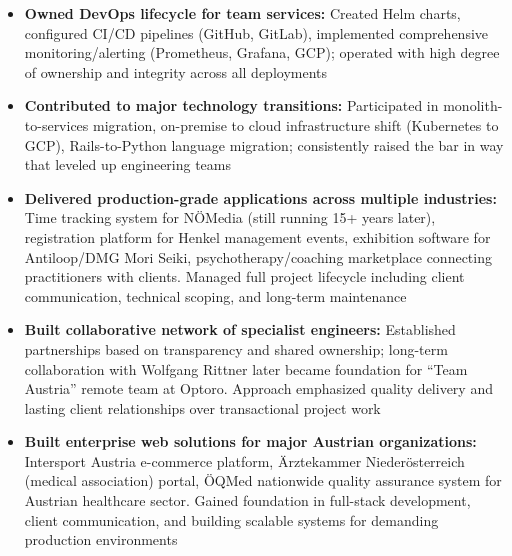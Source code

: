 \documentclass[11pt,a4paper,roman]{moderncv}
\begin{document}
\begin{itemize}[leftmargin=\dimexpr\hintscolumnwidth+\separatorcolumnwidth\relax,itemsep=0pt,topsep=0.35em]
\item \textbf{Owned DevOps lifecycle for team services:} Created Helm charts, configured CI/CD pipelines (GitHub, GitLab), implemented comprehensive monitoring/alerting (Prometheus, Grafana, GCP); operated with high degree of ownership and integrity across all deployments

\item \textbf{Contributed to major technology transitions:} Participated in monolith-to-services migration, on-premise to cloud infrastructure shift (Kubernetes to GCP), Rails-to-Python language migration; consistently raised the bar in way that leveled up engineering teams
\end{itemize}


\begin{itemize}[leftmargin=\dimexpr\hintscolumnwidth+\separatorcolumnwidth\relax,itemsep=0pt,topsep=.35em]
\item \textbf{Delivered production-grade applications across multiple industries:} Time tracking system for NÖMedia (still running 15+ years later), registration platform for Henkel management events, exhibition software for Antiloop/DMG Mori Seiki, psychotherapy/coaching marketplace connecting practitioners with clients. Managed full project lifecycle including client communication, technical scoping, and long-term maintenance

\item \textbf{Built collaborative network of specialist engineers:} Established partnerships based on transparency and shared ownership; long-term collaboration with Wolfgang Rittner later became foundation for ``Team Austria'' remote team at Optoro. Approach emphasized quality delivery and lasting client relationships over transactional project work
\end{itemize}


\begin{itemize}[leftmargin=\dimexpr\hintscolumnwidth+\separatorcolumnwidth\relax,itemsep=0pt,topsep=.35em]
\item \textbf{Built enterprise web solutions for major Austrian organizations:} Intersport Austria e-commerce platform, Ärztekammer Niederösterreich (medical association) portal, ÖQMed nationwide quality assurance system for Austrian healthcare sector. Gained foundation in full-stack development, client communication, and building scalable systems for demanding production environments
\end{itemize}
\end{document}
